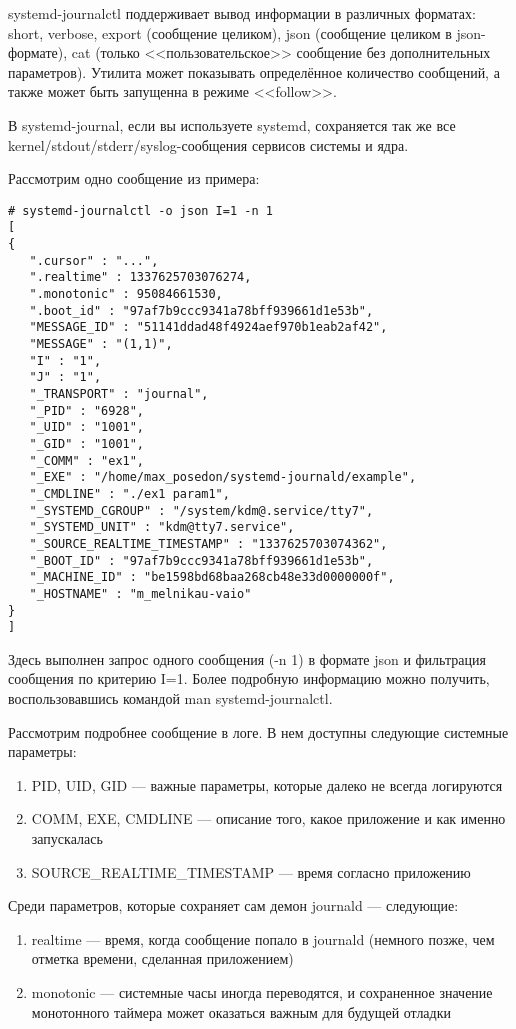 \documentclass[10pt, a5paper]{article}
\begin{document}
systemd-journalctl поддерживает вывод информации в различных форматах: short, verbose, export (сообщение целиком), json (сообщение целиком в json-формате), cat (только <<пользовательское>> сообщение без дополнительных параметров). Утилита может показывать определённое количество сообщений, а также может быть запущенна в режиме <<follow>>.

В systemd-journal, если вы используете systemd, сохраняется так же все kernel/stdout/stderr/syslog-сообщения сервисов системы и ядра.

Рассмотрим одно сообщение из примера:

\begin{verbatim}
# systemd-journalctl -o json I=1 -n 1
[
{
   ".cursor" : "...",
   ".realtime" : 1337625703076274,
   ".monotonic" : 95084661530,
   ".boot_id" : "97af7b9ccc9341a78bff939661d1e53b",
   "MESSAGE_ID" : "51141ddad48f4924aef970b1eab2af42",
   "MESSAGE" : "(1,1)",
   "I" : "1",
   "J" : "1",
   "_TRANSPORT" : "journal",
   "_PID" : "6928",
   "_UID" : "1001",
   "_GID" : "1001",
   "_COMM" : "ex1",
   "_EXE" : "/home/max_posedon/systemd-journald/example",
   "_CMDLINE" : "./ex1 param1",
   "_SYSTEMD_CGROUP" : "/system/kdm@.service/tty7",
   "_SYSTEMD_UNIT" : "kdm@tty7.service",
   "_SOURCE_REALTIME_TIMESTAMP" : "1337625703074362",
   "_BOOT_ID" : "97af7b9ccc9341a78bff939661d1e53b",
   "_MACHINE_ID" : "be1598bd68baa268cb48e33d0000000f",
   "_HOSTNAME" : "m_melnikau-vaio"
}
]
\end{verbatim}

Здесь выполнен запрос одного сообщения (-n 1) в формате json и фильтрация сообщения по критерию I=1. Более подробную информацию можно получить, воспользовавшись командой man systemd-journalctl.

Рассмотрим подробнее сообщение в логе. В нем доступны следующие системные параметры:

\begin{enumerate}
  \item PID, UID, GID --- важные параметры, которые далеко не всегда логируются
  \item COMM, EXE, CMDLINE --- описание того, какое приложение и как именно запускалась
  \item SOURCE\_REALTIME\_TIMESTAMP --- время согласно приложению
\end{enumerate}

Среди параметров, которые сохраняет сам демон journald --- следующие:

\begin{enumerate}
  \item realtime --- время, когда сообщение попало в journald (немного позже, чем отметка времени, сделанная приложением)
  \item monotonic --- системные часы иногда переводятся, и сохраненное значение монотонного таймера может оказаться важным для будущей отладки
\end{enumerate}
\end{document}
